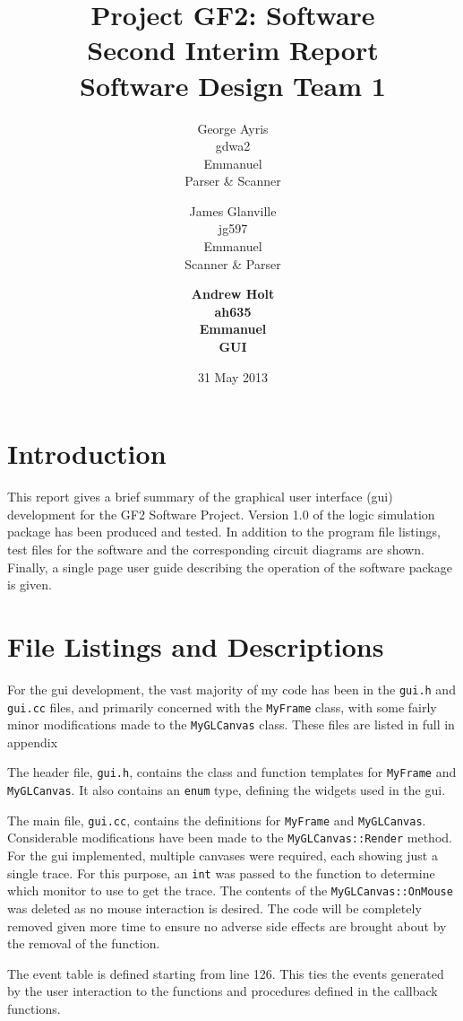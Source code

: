 \documentclass[a4paper,10pt]{article}  %
\title{Project GF2: Software\\ Second Interim Report\\ Software Design
  Team 1}
\author{George Ayris\\ gdwa2\\ Emmanuel \\ Parser \& Scanner \and James Glanville\\
jg597\\ Emmanuel \\ Scanner \& Parser \and \textbf{Andrew Holt}\\
\textbf{ah635}\\ \textbf{Emmanuel}\\ \textbf{GUI}}
\date{31 May 2013}
\begin{document}
\maketitle

\section{Introduction}
\label{sec:introduction}

This report gives a brief summary of the graphical user interface
(gui) development for the GF2 Software Project. Version 1.0 of the
logic simulation package has been produced and tested. In addition to
the program file listings, test files for the software and the
corresponding circuit diagrams are shown. Finally, a single page user
guide describing the operation of the software package is given.

\section{File Listings and Descriptions}
\label{sec:file-list-descr}

For the gui development, the vast majority of my code has been in the
\texttt{gui.h} and \texttt{gui.cc} files, and primarily concerned with
the \texttt{MyFrame} class, with some fairly minor modifications made
to the \texttt{MyGLCanvas} class. These files are listed in full in
appendix 

The header file, \texttt{gui.h}, contains the class and function
templates for \texttt{MyFrame} and \texttt{MyGLCanvas}. It also
contains an \texttt{enum} type, defining the widgets used in the gui.

The main file, \texttt{gui.cc}, contains the definitions for
\texttt{MyFrame} and \texttt{MyGLCanvas}. Considerable modifications
have been made to the \texttt{MyGLCanvas::Render} method. For the gui
implemented, multiple canvases were required, each showing just a
single trace. For this purpose, an \texttt{int} was passed to the
function to determine which monitor to use to get the trace. The
contents of the \texttt{MyGLCanvas::OnMouse} was deleted as no mouse
interaction is desired. The code will be completely removed given more
time to ensure no adverse side effects are brought about by the
removal of the function.

The event table is defined starting from line 126. This ties the
events generated by the user interaction to the functions and
procedures defined in the callback functions.
\end{document}
